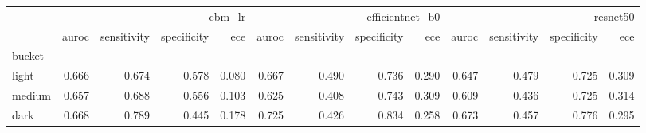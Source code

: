 \begin{tabular}{lrrrrrrrrrrrr}
\toprule
 & \multicolumn{4}{r}{cbm_lr} & \multicolumn{4}{r}{efficientnet_b0} & \multicolumn{4}{r}{resnet50} \\
 & auroc & sensitivity & specificity & ece & auroc & sensitivity & specificity & ece & auroc & sensitivity & specificity & ece \\
bucket &  &  &  &  &  &  &  &  &  &  &  &  \\
\midrule
light & 0.666 & 0.674 & 0.578 & 0.080 & 0.667 & 0.490 & 0.736 & 0.290 & 0.647 & 0.479 & 0.725 & 0.309 \\
medium & 0.657 & 0.688 & 0.556 & 0.103 & 0.625 & 0.408 & 0.743 & 0.309 & 0.609 & 0.436 & 0.725 & 0.314 \\
dark & 0.668 & 0.789 & 0.445 & 0.178 & 0.725 & 0.426 & 0.834 & 0.258 & 0.673 & 0.457 & 0.776 & 0.295 \\
\bottomrule
\end{tabular}
